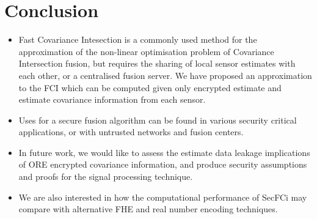 \documentclass[letterpaper, 10 pt, conference]{ieeeconf}  %
\begin{document}
\section{Conclusion}
\begin{itemize}
   \item Fast Covariance Intesection is a commonly used method for the approximation of the non-linear optimisation problem of Covariance Intersection fusion, but requires the sharing of local sensor estimates with each other, or a centralised fusion server. We have proposed an approximation to the FCI which can be computed given only encrypted estimate and estimate covariance information from each sensor.
   \item Uses for a secure fusion algorithm can be found in various security critical applications, or with untrusted networks and fusion centers.
   \item In future work, we would like to assess the estimate data leakage implications of ORE encrypted covariance information, and produce security assumptions and proofs for the signal processing technique.
   \item We are also interested in how the computational performance of SecFCi may compare with alternative FHE and real number encoding techniques.
\end{itemize}





\end{document}
